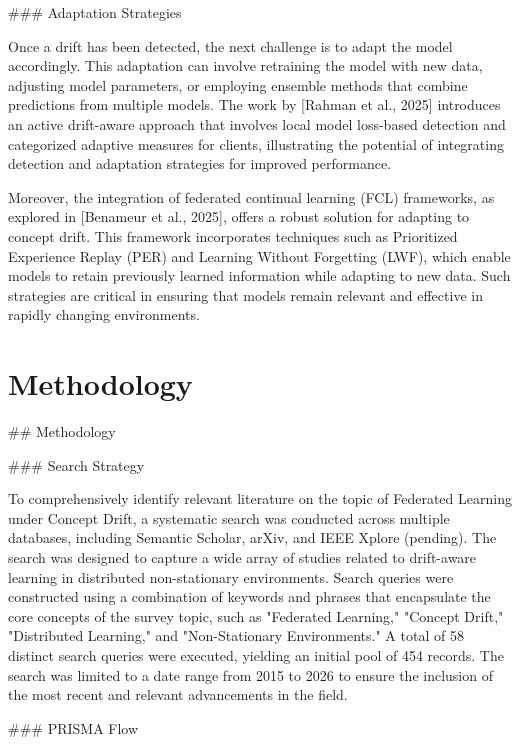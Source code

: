 \documentclass[journal]{IEEEtran}
\begin{document}
\#\#\# Adaptation Strategies

Once a drift has been detected, the next challenge is to adapt the model accordingly. This adaptation can involve retraining the model with new data, adjusting model parameters, or employing ensemble methods that combine predictions from multiple models. The work by [Rahman et al., 2025] introduces an active drift-aware approach that involves local model loss-based detection and categorized adaptive measures for clients, illustrating the potential of integrating detection and adaptation strategies for improved performance.

Moreover, the integration of federated continual learning (FCL) frameworks, as explored in [Benameur et al., 2025], offers a robust solution for adapting to concept drift. This framework incorporates techniques such as Prioritized Experience Replay (PER) and Learning Without Forgetting (LWF), which enable models to retain previously learned information while adapting to new data. Such strategies are critical in ensuring that models remain relevant and effective in rapidly changing environments.

\section{Methodology}
\label{sec:methodology}

\#\# Methodology

\#\#\# Search Strategy

To comprehensively identify relevant literature on the topic of Federated Learning under Concept Drift, a systematic search was conducted across multiple databases, including Semantic Scholar, arXiv, and IEEE Xplore (pending). The search was designed to capture a wide array of studies related to drift-aware learning in distributed non-stationary environments. Search queries were constructed using a combination of keywords and phrases that encapsulate the core concepts of the survey topic, such as "Federated Learning," "Concept Drift," "Distributed Learning," and "Non-Stationary Environments." A total of 58 distinct search queries were executed, yielding an initial pool of 454 records. The search was limited to a date range from 2015 to 2026 to ensure the inclusion of the most recent and relevant advancements in the field.

\#\#\# PRISMA Flow
\end{document}
